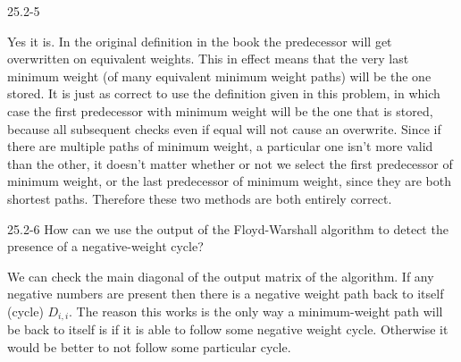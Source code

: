 \begin{problem}{25.2-5}
  \begin{solution}
    Yes it is. In the original definition in the book the predecessor will get overwritten on equivalent weights.
    This in effect means that the very last minimum weight (of many equivalent minimum weight paths) will be the one stored.
    It is just as correct to use the definition given in this problem, in which case the first predecessor with minimum
    weight will be the one that is stored, because all subsequent checks even if equal will not cause an overwrite.
    \br
    Since if there are multiple paths of minimum weight, a particular one isn't more valid than the other, it doesn't
    matter whether or not we select the first predecessor of minimum weight, or the last predecessor of minimum weight,
    since they are both shortest paths.
    \br
    Therefore these two methods are both entirely correct.
  \end{solution}
\end{problem}

\begin{problem}{25.2-6}
  How can we use the output of the Floyd-Warshall algorithm to detect the presence of a negative-weight cycle?
  \begin{solution}
    We can check the main diagonal of the output matrix of the algorithm.  If any negative numbers are present then
    there is a negative weight path back to itself (cycle) $D_{i,i}$.
    \br
    The reason this works is the only way a minimum-weight path will be back to itself is if it is able to follow some
    negative weight cycle. Otherwise it would be better to not follow some particular cycle.
  \end{solution}
\end{problem}



